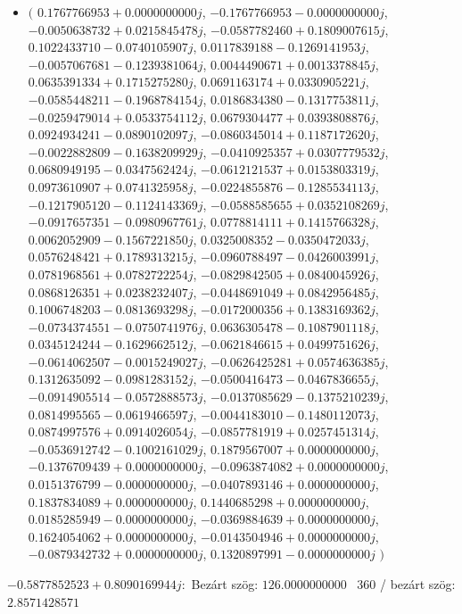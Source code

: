 \documentclass[14pt,a4paper]{article}
\begin{document}
\begin{itemize}
\item
$\big($
$0.1767766953+0.0000000000j$, $-0.1767766953-0.0000000000j$, $-0.0050638732+0.0215845478j$, $-0.0587782460+0.1809007615j$, $0.1022433710-0.0740105907j$, $0.0117839188-0.1269141953j$, $-0.0057067681-0.1239381064j$, $0.0044490671+0.0013378845j$, $0.0635391334+0.1715275280j$, $0.0691163174+0.0330905221j$, $-0.0585448211-0.1968784154j$, $0.0186834380-0.1317753811j$, $-0.0259479014+0.0533754112j$, $0.0679304477+0.0393808876j$, $0.0924934241-0.0890102097j$, $-0.0860345014+0.1187172620j$, $-0.0022882809-0.1638209929j$, $-0.0410925357+0.0307779532j$, $0.0680949195-0.0347562424j$, $-0.0612121537+0.0153803319j$, $0.0973610907+0.0741325958j$, $-0.0224855876-0.1285534113j$, $-0.1217905120-0.1124143369j$, $-0.0588585655+0.0352108269j$, $-0.0917657351-0.0980967761j$, $0.0778814111+0.1415766328j$, $0.0062052909-0.1567221850j$, $0.0325008352-0.0350472033j$, $0.0576248421+0.1789313215j$, $-0.0960788497-0.0426003991j$, $0.0781968561+0.0782722254j$, $-0.0829842505+0.0840045926j$, $0.0868126351+0.0238232407j$, $-0.0448691049+0.0842956485j$, $0.1006748203-0.0813693298j$, $-0.0172000356+0.1383169362j$, $-0.0734374551-0.0750741976j$, $0.0636305478-0.1087901118j$, $0.0345124244-0.1629662512j$, $-0.0621846615+0.0499751626j$, $-0.0614062507-0.0015249027j$, $-0.0626425281+0.0574636385j$, $0.1312635092-0.0981283152j$, $-0.0500416473-0.0467836655j$, $-0.0914905514-0.0572888573j$, $-0.0137085629-0.1375210239j$, $0.0814995565-0.0619466597j$, $-0.0044183010-0.1480112073j$, $0.0874997576+0.0914026054j$, $-0.0857781919+0.0257451314j$, $-0.0536912742-0.1002161029j$, $0.1879567007+0.0000000000j$, $-0.1376709439+0.0000000000j$, $-0.0963874082+0.0000000000j$, $0.0151376799-0.0000000000j$, $-0.0407893146+0.0000000000j$, $0.1837834089+0.0000000000j$, $0.1440685298+0.0000000000j$, $0.0185285949-0.0000000000j$, $-0.0369884639+0.0000000000j$, $0.1624054062+0.0000000000j$, $-0.0143504946+0.0000000000j$, $-0.0879342732+0.0000000000j$, $0.1320897991-0.0000000000j$
$\big)$
\end{itemize}
$-0.5877852523+0.8090169944j$:\
Bezárt szög: $126.0000000000$ \
360 / bezárt szög: $2.8571428571$\
\end{document}
